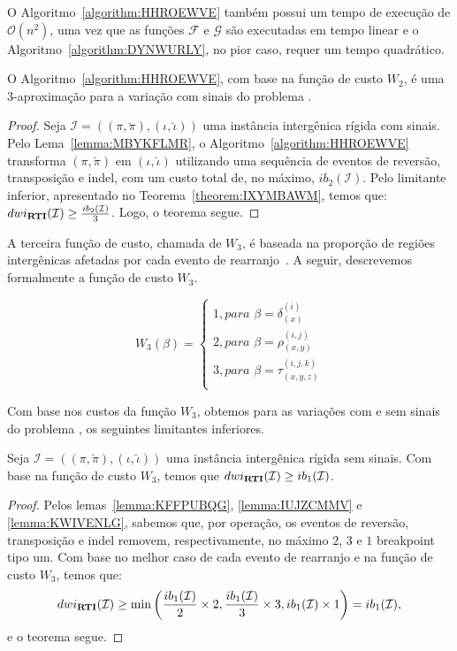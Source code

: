 O Algoritmo~\ref{algorithm:HHROEWVE} também possui um tempo de execução de $\mathcal{O}(n^2)$, uma vez que as funções $\mathcal{F}$ e $\mathcal{G}$ são executadas em tempo linear e o Algoritmo~\ref{algorithm:DYNWURLY}, no pior caso, requer um tempo quadrático.

\begin{theorem}\label{theorem:MJXOZGOO}
O Algoritmo~\ref{algorithm:HHROEWVE}, com base na função de custo $W_2$, é uma $3$-aproximação para a variação com sinais do problema \SbWIRTI{}.
\end{theorem}
\begin{proof}
Seja $\mathcal{I} = ((\pi,\breve\pi),(\iota,\breve\iota))$ uma instância intergênica rígida com sinais. Pelo Lema~\ref{lemma:MBYKFLMR}, o Algoritmo~\ref{algorithm:HHROEWVE} transforma $(\pi,\breve\pi)$ em $(\iota,\breve\iota)$ utilizando uma sequência de eventos de reversão, transposição e indel, com um custo total de, no máximo, $ib_2(\mathcal{I})$. Pelo limitante inferior, apresentado no Teorema~\ref{theorem:IXYMBAWM}, temos que: $dwi_{\textbf{RTI}}(\mathcal{I}) \ge \frac{ib_2(\mathcal{I})}{3}$. Logo, o teorema segue.
\end{proof}

A terceira função de custo, chamada de $W_3$, é baseada na proporção de regiões intergênicas afetadas por cada evento de rearranjo~\cite{2018-alexandrino-etal}. A seguir, descrevemos formalmente a função de custo $W_3$.

$$
  W_3(\beta) = \begin{cases}
      1, \textit{para } \beta = \delta_{(x)}^{(i)} \\
      2, \textit{para } \beta = \rho_{(x,y)}^{(i,j)} \\
      3, \textit{para } \beta = \tau_{(x,y,z)}^{(i,j,k)} \\
  \end{cases}
$$

Com base nos custos da função $W_3$, obtemos para as variações com e sem sinais do problema \SbWIRTI{}, os seguintes limitantes inferiores.

\begin{theorem}\label{theorem:BFKDUKUF}
Seja $\mathcal{I} = ((\pi,\breve\pi),(\iota,\breve\iota))$ uma instância intergênica rígida sem sinais. Com base na função de custo $W_3$, temos que $dwi_{\textbf{RTI}}(\mathcal{I}) \ge ib_1(\mathcal{I})$.
\begin{proof}
Pelos lemas~\ref{lemma:KFFPUBQG}, \ref{lemma:IUJZCMMV} e \ref{lemma:KWIVENLG}, sabemos que, por operação, os eventos de reversão, transposição e indel removem, respectivamente, no máximo $2$, $3$ e $1$ breakpoint tipo um. Com base no melhor caso de cada evento de rearranjo e na função de custo $W_3$, temos que:
$$dwi_{\textbf{RTI}}(\mathcal{I}) \ge \min\left(\frac{ib_1(\mathcal{I})}{2} \times 2,\frac{ib_1(\mathcal{I})}{3} \times 3, ib_1(\mathcal{I}) \times 1\right) = ib_1(\mathcal{I}),$$ e o teorema segue.
\end{proof}
\end{theorem}

